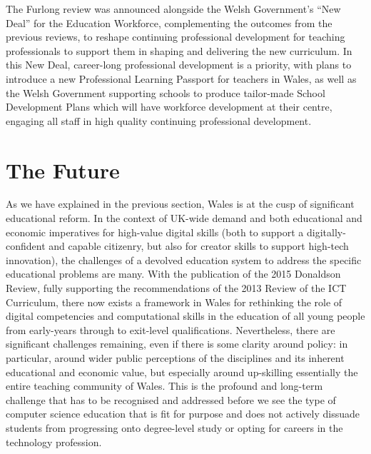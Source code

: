 \documentclass{sig-alternate}
\begin{document}

The Furlong review was announced alongside the Welsh Government's ``New
Deal'' for the Education Workforce, complementing the outcomes from the
previous reviews, to reshape continuing professional development for
teaching professionals to support them in shaping and delivering the
new curriculum. In this New Deal, career-long professional development
is a priority, with plans to introduce a new Professional Learning
Passport for teachers in Wales, as well as the Welsh Government
supporting schools to produce tailor-made School Development Plans
which will have workforce development at their centre, engaging all
staff in high quality continuing professional development.
\break

\section{The Future}\label{conclusions}

As we have explained in the previous section, Wales is at the cusp of
significant educational reform. In the context of UK-wide demand and
both educational and economic imperatives for high-value digital
skills (both to support a digitally-confident and capable citizenry,
but also for creator skills to support high-tech innovation), the
challenges of a devolved education system to address the specific
educational problems are many. With the publication of the 2015
Donaldson Review, fully supporting the recommendations of the 2013
Review of the ICT Curriculum, there now exists a framework in Wales for
rethinking the role of digital competencies and computational skills
in the education of all young people from early-years through to
exit-level qualifications. Nevertheless, there are significant challenges
remaining, even if there is some clarity around policy: in particular,
around wider public perceptions of the disciplines and its inherent
educational and economic value, but especially around up-skilling
essentially the entire teaching community of Wales. This is the
profound and long-term challenge that has to be recognised and
addressed before we see the type of computer science education that is
fit for purpose and does not actively dissuade students from
progressing onto degree-level study or opting for careers in the
technology profession.
\end{document}
